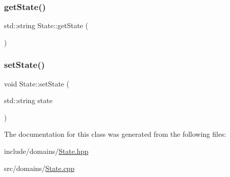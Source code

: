 \subsubsection{\texorpdfstring{getState()}{getState()}}
{\footnotesize\ttfamily std\+::string State\+::get\+State (\begin{DoxyParamCaption}{ }\end{DoxyParamCaption})}

\mbox{\label{class_state_ad267a860927ae9032e808d06d5fc9d30}} 
\subsubsection{\texorpdfstring{setState()}{setState()}}
{\footnotesize\ttfamily void State\+::set\+State (\begin{DoxyParamCaption}\item[{std\+::string}]{state }\end{DoxyParamCaption})}



The documentation for this class was generated from the following files\+:\begin{DoxyCompactItemize}
\item 
include/domains/\mbox{\hyperlink{_state_8hpp}{State.\+hpp}}\item 
src/domains/\mbox{\hyperlink{_state_8cpp}{State.\+cpp}}\end{DoxyCompactItemize}
